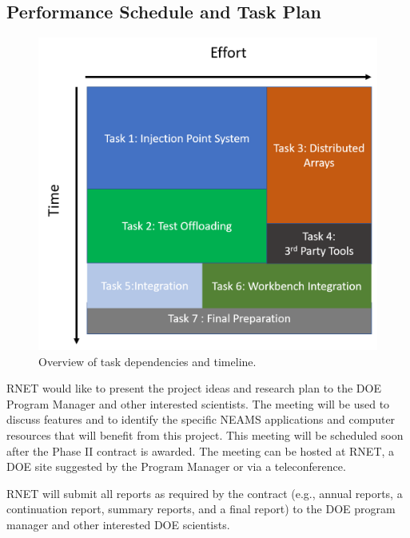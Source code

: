 \subsection{Performance Schedule and Task Plan}
\label{sec:taskplan}

\begin{figure}%
\begin{center}
\leavevmode
\includegraphics[width=1.0\linewidth]{./narrative/figures/tasks.png}
\end{center}
\caption{Overview of task dependencies and timeline.}
\label{fig:tasks}
\end{figure}

RNET would like to present the project ideas and research plan to the
DOE Program Manager and other interested scientists. The meeting will
be used to discuss features and to identify the specific NEAMS applications and computer
resources that will benefit from this project.  This meeting will be
scheduled soon after the Phase II contract is awarded. The meeting can
be hosted at RNET, a DOE site suggested by the Program Manager or via
a teleconference.

RNET will submit all reports as required by the contract (e.g., annual reports, 
a continuation report, summary reports, and a final report) to the DOE program 
manager and other interested DOE scientists.

